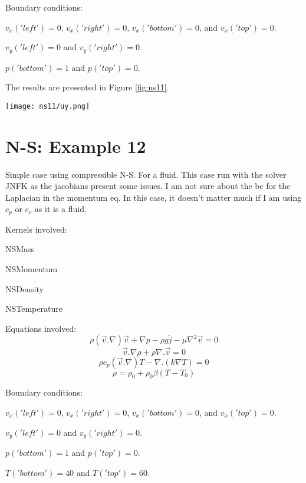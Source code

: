 \documentclass[11pt,letterpaper]{article}
\begin{document}
Boundary conditions:
\begin{description}[]
	\item[] $v_{x}('left')=0$, $v_{x}('right')=0$, $v_{x}('bottom')=0$, and $v_{x}('top')=0$.
	\item[] $v_{y}('left')=0$ and $v_{y}('right')=0$.
	\item[] $p('bottom')=1$ and $p('top')=0$.
\end{description}

The results are presented in Figure \ref{fig:ns11}.
\begin{figure*}[!h]
	\centering
	\texttt{[image: ns11/uy.png]}
	\hfill
	\caption{Velocity for changes in the density due to pressure gradient.}
	\label{fig:ns11}
\end{figure*}

\section{N-S: Example 12}

Simple case using compressible N-S. For a fluid.
This case run with the solver JNFK as the jacobians present some issues.
I am not sure about the bc for the Laplacian in the momentum eq.
In this case, it doesn't matter much if I am using $c_{p}$ or $c_{v}$ as it is a fluid.

Kernels involved:
\begin{description}[font=$\bullet$\scshape\bfseries]
	\item[] NSMass
	\item[] NSMomentum
	\item[] NSDensity
	\item[] NSTemperature
\end{description}

Equations involved:
\begin{equation}
\rho (\vec{v}.\nabla)\vec{v} + \nabla p - \rho g \check{j} - \mu \nabla^{2}\vec{v} = 0
\end{equation}
\begin{equation}
\vec{v}.\nabla\rho+\rho\nabla.\vec{v}=0
\end{equation}
\begin{equation}
\rho c_{p} (\vec{v}.\nabla)T - \nabla .(k\nabla T) = 0
\end{equation}
\begin{equation}
\rho = \rho_{0} + \rho_{0}\beta(T-T_{0})
\end{equation}

Boundary conditions:
\begin{description}[]
	\item[] $v_{x}('left')=0$, $v_{x}('right')=0$, $v_{x}('bottom')=0$, and $v_{x}('top')=0$.
	\item[] $v_{y}('left')=0$ and $v_{y}('right')=0$.
	\item[] $p('bottom')=1$ and $p('top')=0$.
	\item[] $T('bottom')=40$ and $T('top')=60$.
\end{description}
\end{document}
